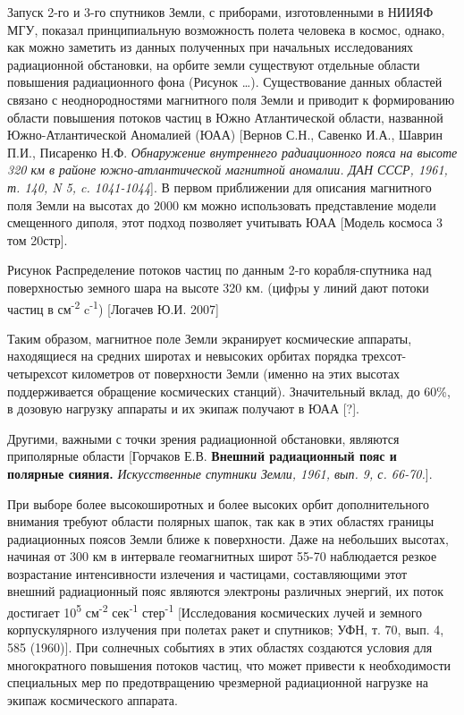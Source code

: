 \documentclass[a4paper,portrait,12pt]{article}
\begin{document}
{{{{Запуск 2-го и 3-го спутников Земли, с приборами, изготовленными в НИИЯФ МГУ,  показал принципиальную возможность полета человека в космос,  однако, как можно заметить из данных полученных при начальных исследованиях радиационной обстановки, на орбите земли существуют отдельные области повышения радиационного фона (Рисунок \ldots{}). Существование данных областей связано с неоднородностями магнитного поля Земли и приводит к формированию области повышения потоков частиц в Южно Атлантической области, названной Южно-Атлантической Аномалией (ЮАА) [Вернов С.Н., Савенко И.А., Шаврин П.И., Писаренко Н.Ф.\emph{ Обнаружение внутреннего радиационного пояса на высоте 320 км в районе южно-атлантической магнитной аномалии. ДАН СССР, 1961, т. 140, N 5, c. 1041-1044}]. В первом приближении для описания магнитного поля  Земли на высотах до 2000 км можно использовать представление модели смещенного диполя, этот подход позволяет учитывать ЮАА [Модель космоса 3 том 20стр].





Рисунок Распределение потоков частиц по данным 2-го корабля-спутника над поверхностью земного шара на высоте 320 км. (цифpы у линий дают потоки частиц в см\textsuperscript{-2} c\textsuperscript{-1}) [Логачев Ю.И. 2007]


Таким образом, магнитное поле Земли экранирует космические аппараты, находящиеся на средних широтах и невысоких орбитах порядка трехсот-четырехсот километров от поверхности Земли (именно на этих высотах поддерживается обращение космических станций). Значительный вклад, до 60\%,  в дозовую нагрузку аппараты и их экипаж получают в ЮАА [?].


Другими, важными с точки зрения радиационной обстановки, являются приполярные области [Горчаков Е.В. \textbf{Внешний радиационный пояс и полярные сияния. }\emph{Искусственные спутники Земли, 1961, вып. 9, с. 66-70.}].


При выборе более высокоширотных и более высоких орбит дополнительного внимания требуют области полярных шапок, так как в этих областях границы радиационных поясов Земли ближе к поверхности. Даже на небольших высотах, начиная от 300 км в интервале геомагнитных широт 55-70 наблюдается резкое возрастание интенсивности излечения и частицами, составляющими этот внешний радиационный пояс являются электроны различных энергий, их поток достигает 10\textsuperscript{5} см\textsuperscript{-2} сек\textsuperscript{-1} стер\textsuperscript{-1} [Исследования космических лучей и земного корпускулярного излучения при полетах ракет и спутников; УФН, т. 70, вып. 4, 585 (1960)]. При солнечных событиях в этих областях создаются условия для многократного повышения потоков частиц, что может привести к необходимости специальных мер по предотвращению чрезмерной радиационной нагрузке на экипаж космического аппарата.

















}}}}
\end{document}

